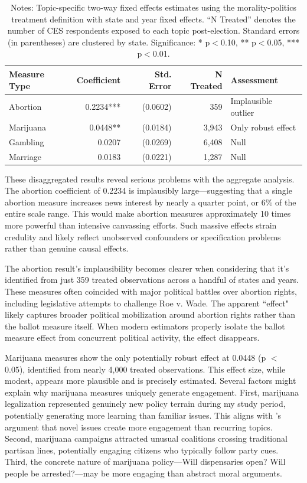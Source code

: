 \documentclass[12pt,letterpaper,oneside]{book}
\begin{document}
\begin{table}[H]
\centering
\caption{Effects by Morality Politics Topic}
\label{tab:morality_topics}
\caption*{\footnotesize Notes: Topic-specific two-way fixed effects estimates using the morality-politics treatment definition with state and year fixed effects. ``N Treated'' denotes the number of CES respondents exposed to each topic post-election. Standard errors (in parentheses) are clustered by state. Significance: * p$<$0.10, ** p$<$0.05, *** p$<$0.01.}
\begin{tabular}{lrrrl}
\hline\hline
Measure Type & Coefficient & Std. Error & N Treated & Assessment \\
\hline
Abortion & 0.2234*** & (0.0602) & 359 & Implausible outlier \\
Marijuana & 0.0448** & (0.0184) & 3,943 & Only robust effect \\
Gambling & 0.0207 & (0.0269) & 6,408 & Null \\
Marriage & 0.0183 & (0.0221) & 1,287 & Null \\
\hline\hline
\end{tabular}
\end{table}

These disaggregated results reveal serious problems with the aggregate analysis. The abortion coefficient of 0.2234 is implausibly large---suggesting that a single abortion measure increases news interest by nearly a quarter point, or 6\% of the entire scale range. This would make abortion measures approximately 10 times more powerful than intensive canvassing efforts. Such massive effects strain credulity and likely reflect unobserved confounders or specification problems rather than genuine causal effects.

The abortion result's implausibility becomes clearer when considering that it's identified from just 359 treated observations across a handful of states and years. These measures often coincided with major political battles over abortion rights, including legislative attempts to challenge Roe v. Wade. The apparent ``effect" likely captures broader political mobilization around abortion rights rather than the ballot measure itself. When modern estimators properly isolate the ballot measure effect from concurrent political activity, the effect disappears.

Marijuana measures show the only potentially robust effect at 0.0448 (p $<$ 0.05), identified from nearly 4,000 treated observations. This effect size, while modest, appears more plausible and is precisely estimated. Several factors might explain why marijuana measures uniquely generate engagement. First, marijuana legalization represented genuinely new policy terrain during my study period, potentially generating more learning than familiar issues. This aligns with \citet{nicholson2003agenda}'s argument that novel issues create more engagement than recurring topics. Second, marijuana campaigns attracted unusual coalitions crossing traditional partisan lines, potentially engaging citizens who typically follow party cues. Third, the concrete nature of marijuana policy---Will dispensaries open? Will people be arrested?---may be more engaging than abstract moral arguments.
\end{document}

